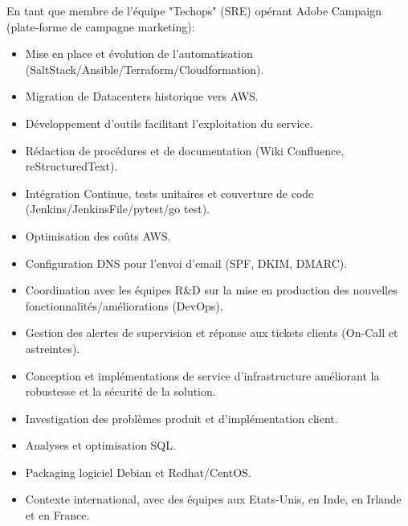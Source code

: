 \documentclass[10pt,a4paper,sans]{moderncv}        %
\begin{document}
        {}
        {}
        {}
        {En tant que membre de l'équipe "Techops" (SRE) opérant Adobe Campaign (plate-forme de campagne marketing):
            \begin{itemize}
            \item Mise en place et évolution de l'automatisation (SaltStack/Ansible/Terraform/Cloudformation).
            \item Migration de Datacenters historique vers AWS.
            \item Développement d'outils facilitant l'exploitation du service.
            \item Rédaction de procédures et de documentation (Wiki Confluence, reStructuredText).
            \item Intégration Continue, tests unitaires et couverture de code (Jenkins/JenkinsFile/pytest/go test).
            \item Optimisation des coûts AWS.
            \item Configuration DNS pour l'envoi d'email (SPF, DKIM, DMARC).
            \item Coordination avec les équipes R\&D sur la mise en production des nouvelles fonctionnalités/améliorations (DevOps).
            \item Gestion des alertes de supervision et réponse aux tickets clients (On-Call et astreintes).
            \item Conception et implémentations de service d'infrastructure améliorant la robustesse et la sécurité de la solution.
            \item Investigation des problèmes produit et d'implémentation client.
            \item Analyses et optimisation SQL.
            \item Packaging logiciel Debian et Redhat/CentOS.
            \item Contexte international, avec des équipes aux Etats-Unis, en Inde, en Irlande et en France.
            \end{itemize}
        }
\end{document}
